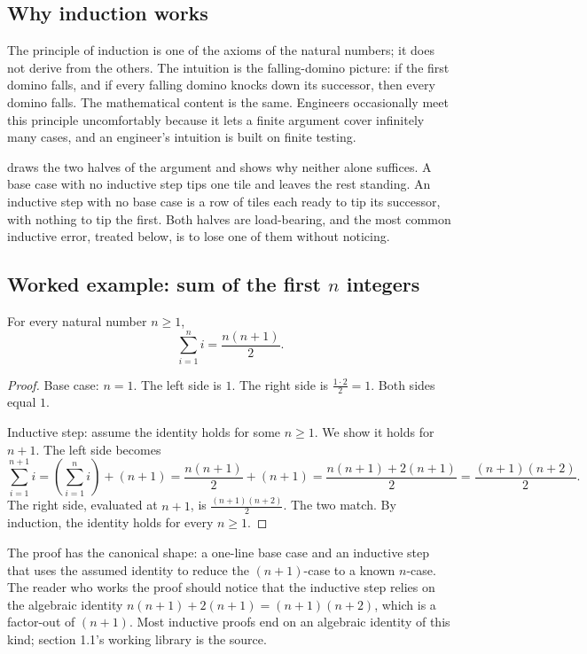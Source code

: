 \subsection{Why induction works}

The principle of induction is one of the axioms of the natural
numbers; it does not derive from the others. The intuition is the
falling-domino picture: if the first domino falls, and if every
falling domino knocks down its successor, then every domino falls.
The mathematical content is the same. Engineers occasionally meet
this principle uncomfortably because it lets a finite argument cover
infinitely many cases, and an engineer's intuition is built on
finite testing.



 draws the two halves of the
argument and shows why neither alone suffices. A base case with no
inductive step tips one tile and leaves the rest standing. An inductive
step with no base case is a row of tiles each ready to tip its
successor, with nothing to tip the first. Both halves are load-bearing,
and the most common inductive error, treated below, is to lose one of
them without noticing.

\subsection{Worked example: sum of the first $n$ integers}

\begin{theorem}
For every natural number $n \geq 1$,
\[
\sum_{i=1}^{n} i = \frac{n(n+1)}{2}.
\]
\end{theorem}

\begin{proof}
Base case: $n = 1$. The left side is $1$. The right side is $\tfrac{1
\cdot 2}{2} = 1$. Both sides equal $1$.

Inductive step: assume the identity holds for some $n \geq 1$. We
show it holds for $n+1$. The left side becomes
\[
\sum_{i=1}^{n+1} i = \left(\sum_{i=1}^{n} i\right) + (n+1)
= \frac{n(n+1)}{2} + (n+1)
= \frac{n(n+1) + 2(n+1)}{2}
= \frac{(n+1)(n+2)}{2}.
\]
The right side, evaluated at $n+1$, is $\tfrac{(n+1)(n+2)}{2}$. The
two match. By induction, the identity holds for every $n \geq 1$.
\end{proof}

The proof has the canonical shape: a one-line base case and an
inductive step that uses the assumed identity to reduce the
$(n+1)$-case to a known $n$-case. The reader who works the proof
should notice that the inductive step relies on the algebraic
identity $n(n+1) + 2(n+1) = (n+1)(n+2)$, which is a factor-out of
$(n+1)$. Most inductive proofs end on an algebraic identity of this
kind; section 1.1's working library is the source.

